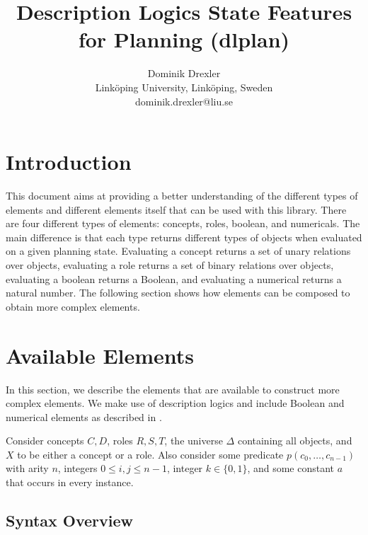 \documentclass{article}
\title{
    Description Logics State Features for Planning (dlplan)
}
\author{
Dominik Drexler \\
Link{\"o}ping University, Link\"oping, Sweden\\
dominik.drexler@liu.se
}
\begin{document}
\maketitle

\newcommand{\emptyelement}[1]{\ensuremath{\mathit{Empty}(#1)}}

\newcommand{\countelement}[1]{\ensuremath{\mathit{Count}(#1)}}
\newcommand{\conceptdistanceelement}[3]{\ensuremath{\mathit{ConceptDistance}(#1, #2, #3)}}
\newcommand{\sumconceptdistanceelement}[3]{\ensuremath{\mathit{SumConceptDistance}(#1, #2, #3)}}
\newcommand{\roledistanceelement}[3]{\ensuremath{\mathit{RoleDistance}(#1, #2, #3)}}
\newcommand{\sumroledistanceelement}[3]{\ensuremath{\mathit{SumRoleDistance}(#1, #2, #3)}}

\section{Introduction}

This document aims at providing a better understanding of the different types of elements
and different elements itself that can be used with this library.
There are four different types of elements: concepts, roles, boolean, and numericals.
The main difference is that each type returns different types of objects when evaluated on a given planning state.
Evaluating a concept returns a set of unary relations over objects,
evaluating a role returns a set of binary relations over objects,
evaluating a boolean returns a Boolean, and
evaluating a numerical returns a natural number.
The following section shows how elements can be composed to obtain more complex elements.

\section{Available Elements}

In this section, we describe the elements that are available to construct more complex elements.
We make use of description logics \cite{baader-et-al-2003} and include Boolean and numerical
elements as described in \cite{drexler-et-al-arxiv2021}.

Consider concepts $C, D$, roles $R, S, T$,
the universe $\Delta$ containing all objects,
and $X$ to be either a concept or a role.
Also consider some predicate $p(c_0,\ldots,c_{n-1})$ with arity $n$,
integers $0\leq i,j\leq n-1$, integer $k\in\{0, 1\}$, and
some constant $a$ that occurs in every instance.

\subsection{Syntax Overview}
\end{document}
